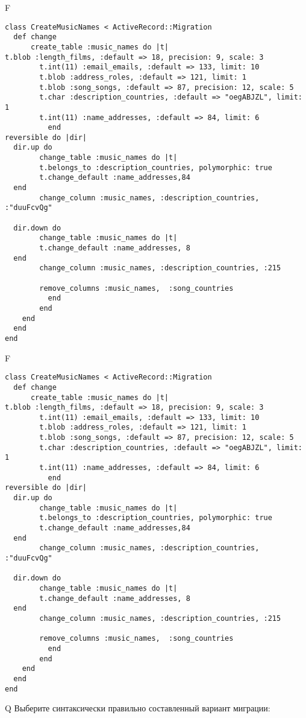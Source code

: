 F
\begin{verbatim}
class CreateMusicNames < ActiveRecord::Migration
  def change
	  create_table :music_names do |t|
t.blob :length_films, :default => 18, precision: 9, scale: 3
		t.int(11) :email_emails, :default => 133, limit: 10
		t.blob :address_roles, :default => 121, limit: 1
		t.blob :song_songs, :default => 87, precision: 12, scale: 5
		t.char :description_countries, :default => "oegABJZL", limit: 1
		t.int(11) :name_addresses, :default => 84, limit: 6
		  end
reversible do |dir|
  dir.up do
		change_table :music_names do |t|
		t.belongs_to :description_countries, polymorphic: true
 		t.change_default :name_addresses,84
  end
 		change_column :music_names, :description_countries, :"duuFcvQg"
   
  dir.down do
		change_table :music_names do |t|
		t.change_default :name_addresses, 8
  end
 		change_column :music_names, :description_countries, :215
   
		remove_columns :music_names,  :song_countries 
	      end
	    end
    end 
  end
end

\end{verbatim}

F
\begin{verbatim}
class CreateMusicNames < ActiveRecord::Migration
  def change
	  create_table :music_names do |t|
t.blob :length_films, :default => 18, precision: 9, scale: 3
		t.int(11) :email_emails, :default => 133, limit: 10
		t.blob :address_roles, :default => 121, limit: 1
		t.blob :song_songs, :default => 87, precision: 12, scale: 5
		t.char :description_countries, :default => "oegABJZL", limit: 1
		t.int(11) :name_addresses, :default => 84, limit: 6
		  end
reversible do |dir|
  dir.up do
		change_table :music_names do |t|
		t.belongs_to :description_countries, polymorphic: true
 		t.change_default :name_addresses,84
  end
 		change_column :music_names, :description_countries, :"duuFcvQg"
   
  dir.down do
		change_table :music_names do |t|
		t.change_default :name_addresses, 8
  end
 		change_column :music_names, :description_countries, :215
   
		remove_columns :music_names,  :song_countries 
	      end
	    end
    end 
  end
end

\end{verbatim}

Q
Выберите синтаксически правильно составленный вариант миграции:

